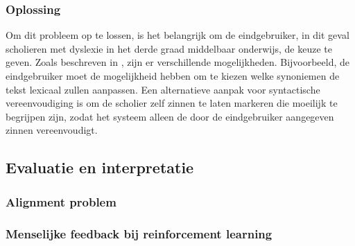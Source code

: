 
\subsubsection{Oplossing}

Om dit probleem op te lossen, is het belangrijk om de eindgebruiker, in dit geval scholieren met dyslexie in het derde graad middelbaar onderwijs, de keuze te geven. Zoals beschreven in \textcite{Gooding2022}, zijn er verschillende mogelijkheden. Bijvoorbeeld, de eindgebruiker moet de mogelijkheid hebben om te kiezen welke synoniemen de tekst lexicaal zullen aanpassen. Een alternatieve aanpak voor syntactische vereenvoudiging is om de scholier zelf zinnen te laten markeren die moeilijk te begrijpen zijn, zodat het systeem alleen de door de eindgebruiker aangegeven zinnen vereenvoudigt.

\subsection{Evaluatie en interpretatie}

\subsubsection{Alignment problem}


\subsubsection{Menselijke feedback bij reinforcement learning}

